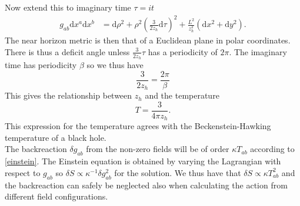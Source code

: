 \documentclass[12pt]{report}
\renewcommand{\d}{\ensuremath{\mathrm{d}}}
\renewcommand{\i}{\ensuremath{i}}
\begin{document}
Now extend this to imaginary time $\tau=\i t$
\begin{equation}
\begin{split}
 g_{ab}\d x^a\d x^b
&= \d \rho^2 +\rho^2\left(\frac{3}{2z_h}\d \tau\right)^2+\frac{L^2}{z_h^2}\left(\d x^2+\d y^2\right).
\end{split}
\end{equation}
The near horizon metric is then that of a Euclidean plane in polar coordinates. There is thus a deficit angle unless $\frac{3}{2z_h}\tau$ has a periodicity of $2\pi$. The imaginary time has periodicity $\beta$ so we thus have
\begin{equation}
 \frac{3}{2z_h}=\frac{2\pi}{\beta}
\end{equation}
This gives the relationship between $z_h$ and the temperature
\begin{equation}
 T=\frac{3}{4\pi  z_h}\label{T}.
\end{equation}
This expression for the temperature agrees with the Beckenstein-Hawking temperature of a black hole.\\

The backreaction $\delta g_{ab}$ from the non-zero fields will be of order $\kappa T_{ab}$ according to \eqref{einstein}. The Einstein equation is obtained by varying the Lagrangian with respect to $g_{ab}$ so $\delta S\propto\kappa^{-1}\delta g_{ab}^2$ for the solution. We thus have that $\delta S\propto\kappa T_{ab}^2$ and the backreaction can safely be neglected also when calculating the action from different field configurations.\\
\end{document}
